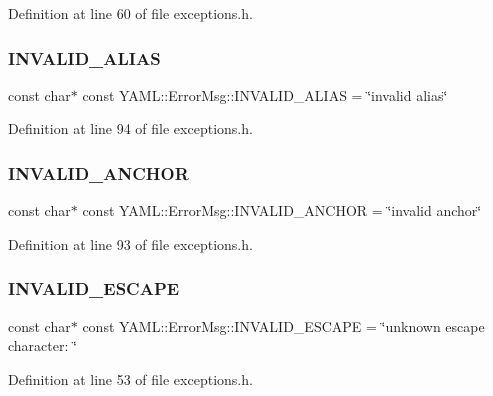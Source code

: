 Definition at line 60 of file exceptions.\+h.

\mbox{\label{namespace_y_a_m_l_1_1_error_msg_ae5aed8f67de0bce46c4871490566e33c}} 
\subsubsection{\texorpdfstring{INVALID\_ALIAS}{INVALID\_ALIAS}}
{\footnotesize\ttfamily const char$\ast$ const Y\+A\+M\+L\+::\+Error\+Msg\+::\+I\+N\+V\+A\+L\+I\+D\+\_\+\+A\+L\+I\+AS = \char`\"{}invalid alias\char`\"{}}



Definition at line 94 of file exceptions.\+h.

\mbox{\label{namespace_y_a_m_l_1_1_error_msg_a36a144f47e57b66fdeeafdec1833178b}} 
\subsubsection{\texorpdfstring{INVALID\_ANCHOR}{INVALID\_ANCHOR}}
{\footnotesize\ttfamily const char$\ast$ const Y\+A\+M\+L\+::\+Error\+Msg\+::\+I\+N\+V\+A\+L\+I\+D\+\_\+\+A\+N\+C\+H\+OR = \char`\"{}invalid anchor\char`\"{}}



Definition at line 93 of file exceptions.\+h.

\mbox{\label{namespace_y_a_m_l_1_1_error_msg_a8bc9a3fadf1061dcd05b3ff20246bc90}} 
\subsubsection{\texorpdfstring{INVALID\_ESCAPE}{INVALID\_ESCAPE}}
{\footnotesize\ttfamily const char$\ast$ const Y\+A\+M\+L\+::\+Error\+Msg\+::\+I\+N\+V\+A\+L\+I\+D\+\_\+\+E\+S\+C\+A\+PE = \char`\"{}unknown escape character\+: \char`\"{}}



Definition at line 53 of file exceptions.\+h.

